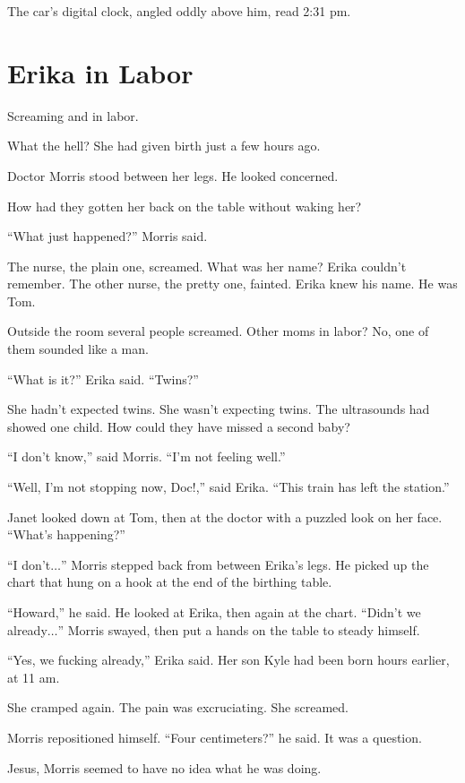 The car's digital clock, angled oddly above him, read 2:31 pm.



\chapter{Erika in Labor}

 Screaming and in labor.

What the hell? She had given birth just a few hours ago.

Doctor Morris stood between her legs. He looked concerned.

How had they gotten her back on the table without waking her?

``What just happened?'' Morris said.

The nurse, the plain one, screamed. What was her name? Erika couldn't remember. The other nurse, the pretty one, fainted. Erika knew his name. He was Tom.

Outside the room several people screamed. Other moms in labor? No, one of them sounded like a man.

``What is it?'' Erika said. ``Twins?''

She hadn't expected twins. She wasn't expecting twins. The ultrasounds had showed one child. How could they have missed a second baby?

``I don't know,'' said Morris. ``I'm not feeling well.''

``Well, I'm not stopping now, Doc!,'' said Erika. ``This train has left the station.''

Janet looked down at Tom, then at the doctor with a puzzled look on her face. ``What's happening?''

``I don't$\ldots$'' Morris stepped back from between Erika's legs. He picked up the chart that hung on a hook at the end of the birthing table.

``Howard,'' he said. He looked at Erika, then again at the chart. ``Didn't we already$\ldots$'' Morris swayed, then put a hands on the table to steady himself.

``Yes, we fucking already,'' Erika said. Her son Kyle had been born hours earlier, at 11 am.

She cramped again. The pain was excruciating. She screamed.

Morris repositioned himself. ``Four centimeters?'' he said. It was a question.

Jesus, Morris seemed to have no idea what he was doing.

